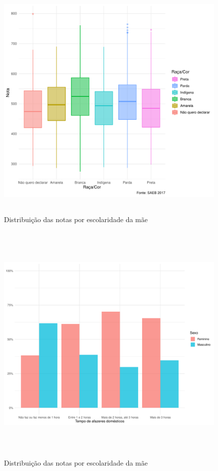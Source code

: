 \newpage

\begin{figure}[h]
    \caption{Distribuição das notas por escolaridade da mãe}
    \begin{center}
        \includegraphics[width=16cm,height=12cm]{img/raca_cor_notas.pdf}
    \end{center}
\end{figure}

\newpage

\begin{figure}[h]
    \caption{Distribuição das notas por escolaridade da mãe}
    \begin{center}
        \includegraphics[width=16cm,height=12cm]{img/sexo_afazeres.pdf}
    \end{center}
\end{figure}
